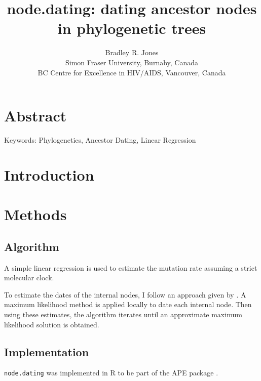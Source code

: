\documentclass[12pt]{article}
\newcommand{\code}[1]{{\tt #1}}
\begin{document}
\title{node.dating: dating ancestor nodes in phylogenetic trees}

\author{Bradley R. Jones \\ Simon Fraser University, Burnaby, Canada \\ BC Centre for Excellence in HIV/AIDS, Vancouver, Canada}
\baselineskip 22pt
\pagewiselinenumbers

\date{}
\maketitle

\section * {Abstract}

Keywords: 
Phylogenetics, Ancestor Dating, Linear Regression \\



\underline{}
\section*{Introduction} \label{sec:intro}


\section*{Methods} \label{sec:methods}

\subsection*{Algorithm} \label{sec:alg}
A simple linear regression is used to estimate the mutation rate assuming a strict molecular clock.

To estimate the dates of the internal nodes, I follow an approach given by \cite{Felsenstein81}. A maximum likelihood method is applied locally to date each internal node. Then using these estimates, the algorithm iterates until an approximate maximum likelihood solution is obtained.

\subsection*{Implementation} \label{sec:impl}
\code{node.dating} was implemented in R to be part of the APE package \citep{APE}.
\end{document}
